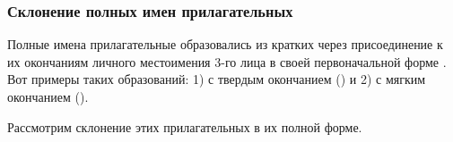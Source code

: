 \documentclass[11pt,a4paper,oneside]{memoir}
\begin{document}
                \subsubsection{Склонение полных имен прилагательных}

    Полные имена прилагательные образовались из кратких через присоединение к их окончаниям личного местоимения 3-го лица в своей первоначальной форме {}. Вот примеры таких образований: 1) с твердым окончанием ({}) и 2) с мягким окончанием ({}).
    
    \bigskip{}

    Рассмотрим склонение этих прилагательных в их полной форме.
    
\end{document}
